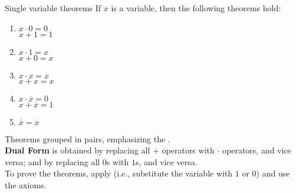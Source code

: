 \begin{parag}{Single variable theorems}
    If $x$ is a variable, then the following theorems hold:
    \begin{enumerate}
    \item 
$        x \cdot0 = 0 $\\
 $       x + 1 = 1$
\item 
     $x \cdot 1 = x $\\
$     x + 0 = x$
\item
    $x \cdot x = x$ \\
$    x + x = x$
 \item 
$         x \cdot \overline{x} = 0$ \\
 $        x + \overline{x} = 1$
  \item 
$          \overline{\overline{x}} = x $
    \end{enumerate}
    Theorems grouped in pairs, emphasizing the .
    \\
    \textbf{Dual Form} is obtained by replacing all $+$ operators with $ \cdot$ operators, and vice versa; and by replacing all $0$s with $1$s, and vice versa. \\
    To prove the theorems, apply  (i.e., substitute the variable with $1$ or $0$) and use the axioms.
\end{parag}

